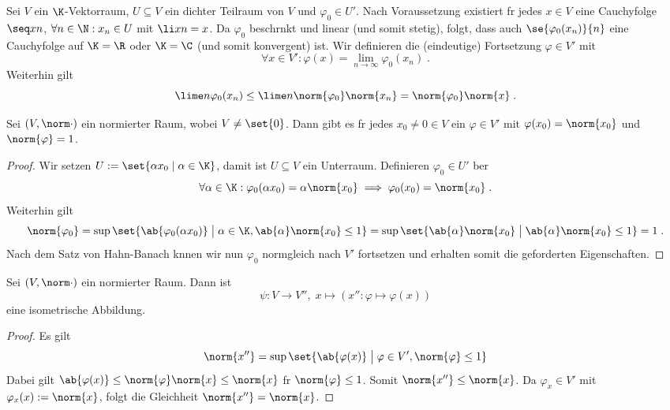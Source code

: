 	\begin{ex}
		Sei $V$ ein $\K$-Vektorraum, \(U\subseteq V\) ein dichter Teilraum von $V$ und \(\varphi_0\in U'\). Nach Voraussetzung existiert f\us r jedes \(x\in V\) eine Cauchyfolge  \(\seq xn\), \(\forall n\in \N: x_n \in U\) mit \(\li xn = x\). Da $\varphi_0$ beschr\as nkt und linear (und somit stetig), folgt, dass auch \(\se{\varphi_0(x_n)}{n}\) eine Cauchyfolge auf  \(\K = \R\) oder \(\K = \C\) (und somit konvergent) ist. Wir definieren die (eindeutige) Fortsetzung \(\varphi \in V'\) mit
		\[\forall x\in V' : \varphi(x) = \lim_{n\to\infty} \varphi_0(x_n)\;.\]
		Weiterhin gilt
		\[\lime n \varphi_0(x_n) \leq \lime n\norm{\varphi_0} \norm{x_n} = \norm{\varphi_0}\norm{x}\;. \]
	\end{ex} 
	
	\begin{theorem}
		Sei \((V,\norm\cdot)\) ein normierter Raum, wobei \(V \neq \set{0}\). Dann gibt es f\us r jedes \(x_0\neq 0 \in V\) ein \(\varphi \in V'\) mit \(\varphi(x_0) = \norm{x_0}\) und \(\norm{\varphi} = 1\).
	\end{theorem}
	\begin{proof}
		Wir setzen \(U:=\set{\alpha x_0\;\vert\; \alpha \in \K}\), damit ist \(U\subseteq V\) ein Unterraum. Definieren \(\varphi_0\in U'\) \us ber 
		\[\forall \alpha \in \K: \varphi_0(\alpha x_0) = \alpha \norm{x_0} \implies \varphi_0(x_0) = \norm{x_0}\;.\]
		Weiterhin gilt
		\[\norm{\varphi_0} = \sup \set{\ab{\varphi_0(\alpha x_0)} \;\big\vert\; \alpha \in \K, \ab{\alpha}\norm{x_0} \leq 1} = \sup \set{\ab{\alpha} \norm{x_0} \;\big\vert\; \ab{\alpha}\norm{x_0} \leq 1} = 1\;.\]
		Nach dem Satz von Hahn-Banach k\os nnen wir nun \(\varphi_0\) normgleich nach \(V'\) fortsetzen und erhalten somit die geforderten Eigenschaften.
	\end{proof}	
	
	\begin{theorem}
		\label{Doppeldual_1} Sei \((V,\norm\cdot)\) ein normierter Raum. Dann ist 
		\[\psi: V \to V'',\; x \mapsto (x'':\varphi \mapsto \varphi(x))\]
		eine isometrische Abbildung.
	\end{theorem}
	\begin{proof}
		Es gilt 
		\[\norm{x''} = \sup\set{\ab{\varphi(x)} \;\big\vert\;\varphi\in V', \norm{\varphi} \leq 1} \]
		Dabei gilt \(\ab{\varphi(x)} \leq \norm{\varphi}\norm{x} \leq \norm{x}\) f\us r \(\norm{\varphi}\leq 1\). Somit \(\norm{x''} \leq \norm{x}\). Da \(\varphi_x \in V'\) mit \(\varphi_x(x):= \norm{x}\), folgt die Gleichheit \(\norm{x''} = \norm{x}\).
			
	\end{proof}
	
